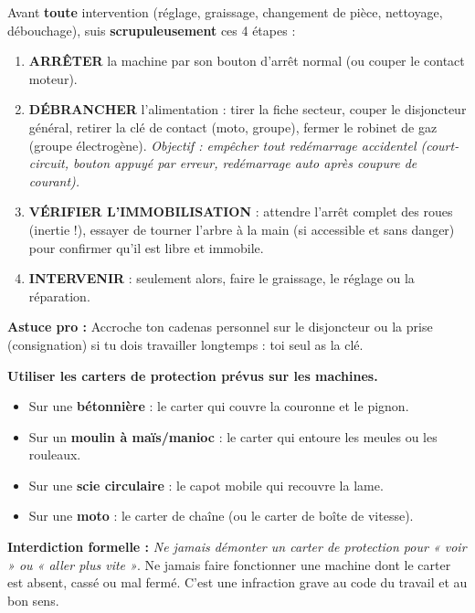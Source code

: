 \documentclass[11pt]{article}
\begin{document}
\begin{methode}
Avant \textbf{toute} intervention (réglage, graissage, changement de pièce, nettoyage, débouchage), suis \textbf{scrupuleusement} ces 4 étapes :
\begin{enumerate}
    \item \textbf{ARRÊTER} la machine par son bouton d'arrêt normal (ou couper le contact moteur).
    \item \textbf{DÉBRANCHER} l'alimentation : tirer la fiche secteur, couper le disjoncteur général, retirer la clé de contact (moto, groupe), fermer le robinet de gaz (groupe électrogène). \emph{Objectif : empêcher tout redémarrage accidentel (court-circuit, bouton appuyé par erreur, redémarrage auto après coupure de courant).}
    \item \textbf{VÉRIFIER L'IMMOBILISATION} : attendre l'arrêt complet des roues (inertie !), essayer de tourner l'arbre à la main (si accessible et sans danger) pour confirmer qu'il est libre et immobile.
    \item \textbf{INTERVENIR} : seulement alors, faire le graissage, le réglage ou la réparation.
\end{enumerate}
\textbf{Astuce pro :} Accroche ton cadenas personnel sur le disjoncteur ou la prise (consignation) si tu dois travailler longtemps : toi seul as la clé.
\end{methode}

\begin{propriete}
\textbf{Utiliser les carters de protection prévus sur les machines.}
\begin{itemize}
    \item Sur une \textbf{bétonnière} : le carter qui couvre la couronne et le pignon.
    \item Sur un \textbf{moulin à maïs/manioc} : le carter qui entoure les meules ou les rouleaux.
    \item Sur une \textbf{scie circulaire} : le capot mobile qui recouvre la lame.
    \item Sur une \textbf{moto} : le carter de chaîne (ou le carter de boîte de vitesse).
\end{itemize}
\textbf{Interdiction formelle :} \emph{Ne jamais démonter un carter de protection pour « voir » ou « aller plus vite »}. Ne jamais faire fonctionner une machine dont le carter est absent, cassé ou mal fermé. C'est une infraction grave au code du travail et au bon sens.
\end{propriete}
\end{document}
